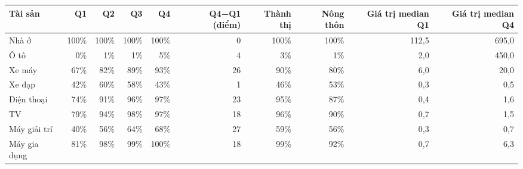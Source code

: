\begin{tabular}{lrrrrrrrrr}
\toprule
Tài sản & Q1 & Q2 & Q3 & Q4 & Q4−Q1 (điểm) & Thành thị & Nông thôn & Giá trị median Q1 & Giá trị median Q4 \\
\midrule
Nhà ở & 100\% & 100\% & 100\% & 100\% & 0 & 100\% & 100\% & 112,5 & 695,0 \\
Ô tô & 0\% & 1\% & 1\% & 5\% & 4 & 3\% & 1\% & 2,0 & 450,0 \\
Xe máy & 67\% & 82\% & 89\% & 93\% & 26 & 90\% & 80\% & 6,0 & 20,0 \\
Xe đạp & 42\% & 60\% & 58\% & 43\% & 1 & 46\% & 53\% & 0,3 & 0,5 \\
Điện thoại & 74\% & 91\% & 96\% & 97\% & 23 & 95\% & 87\% & 0,4 & 1,6 \\
TV & 79\% & 94\% & 98\% & 97\% & 18 & 96\% & 90\% & 0,7 & 1,5 \\
Máy giải trí & 40\% & 56\% & 64\% & 68\% & 27 & 59\% & 56\% & 0,3 & 0,7 \\
Máy gia dụng & 81\% & 98\% & 99\% & 100\% & 18 & 99\% & 92\% & 0,7 & 6,3 \\
\bottomrule
\end{tabular}
